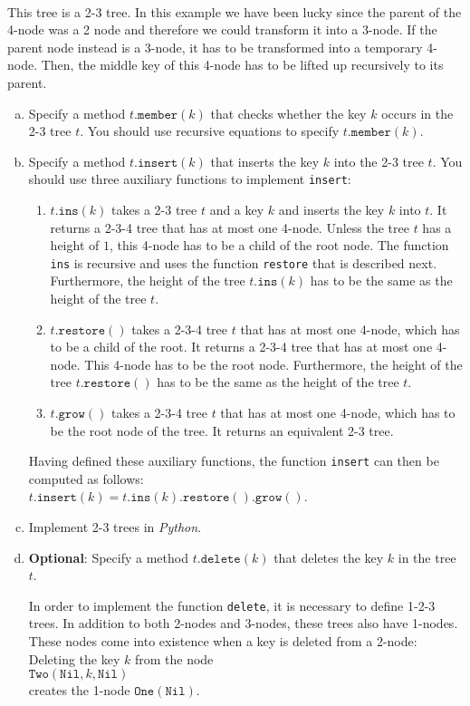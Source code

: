 \\[0.2cm]
This tree is a 2-3 tree.  In this example we have been lucky since the parent of the 4-node was
a 2 node and therefore we could transform it into a 3-node.  If the parent node instead is a 3-node,
it has to be transformed into a temporary 4-node.  Then, the middle key of this 4-node has to be
lifted up recursively to its parent.  
\begin{enumerate}[(a)]
\item Specify a method $t.\texttt{member}(k)$ that checks whether the key $k$ occurs in the 2-3 tree
      $t$.  You should use recursive equations to specify  $t.\texttt{member}(k)$.
\item Specify a method $t.\texttt{insert}(k)$ that inserts the key $k$ into the 2-3 tree
      $t$.  You should use three auxiliary functions to implement \texttt{insert}:
      \begin{enumerate}
      \item $t.\texttt{ins}(k)$ takes a 2-3 tree $t$ and a key $k$ and inserts the key $k$ into $t$.
            It returns a 2-3-4 tree that has at most one 4-node.  Unless the tree $t$ has a height of $1$, this
            4-node has to be a child of the root node.  The function \texttt{ins} is recursive and uses the
            function \texttt{restore} that is described next.
            Furthermore, the height of the tree $t.\mathtt{ins}(k)$ has to be the same as the height of the tree $t$.
      \item $t.\texttt{restore}()$ takes a 2-3-4 tree $t$ that has at most one 4-node, which has to be a child
            of the root.  It returns a 2-3-4 tree that has at most one 4-node.  This 4-node has to be the root node.
            Furthermore, the height of the tree $t.\mathtt{restore}()$ has to be the same as the height of the tree $t$.
      \item $t.\texttt{grow}()$ takes a 2-3-4 tree $t$ that has at most one 4-node, which has to be the root
            node of the tree.  It returns an equivalent 2-3 tree.
      \end{enumerate}
      Having defined these auxiliary functions, the function \texttt{insert} can then be computed as follows:
      \\[0.2cm]
      \hspace*{1.3cm}
      $t.\texttt{insert}(k) = t.\texttt{ins}(k).\texttt{restore}().\texttt{grow}()$.
\item Implement 2-3 trees in \textsl{Python}.
\item \textbf{Optional}: Specify a method $t.\texttt{delete}(k)$ that deletes the key $k$ in the tree $t$.

      In order to implement the function \texttt{delete}, it is necessary to define 1-2-3 trees.
      In addition to both 2-nodes and 3-nodes, these trees also have 1-nodes.  These nodes come into existence
      when a key is deleted from a 2-node:  Deleting the key $k$ from the node
      \\[0.2cm]
      \hspace*{1.3cm}
      $\texttt{Two}(\texttt{Nil}, k, \texttt{Nil})$
      \\[0.2cm]
      creates the 1-node $\texttt{One}(\texttt{Nil})$.
\end{enumerate}
